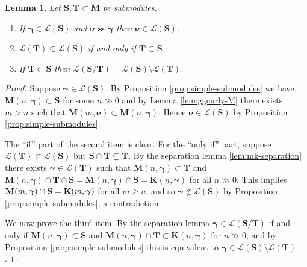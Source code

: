 \documentclass[11pt,fleqn]{amsart}
\newtheorem{lem}[thm]{Lemma}
\theoremstyle{definition}
\theoremstyle{remark}
\theoremstyle{remark}
\newcommand\wt[1]{\boldsymbol{#1}}
\begin{document}
\begin{lem}
\label{lem:support-sets}
Let $\mathbf S, \mathbf T \subset \mathbf M$ be submodules. 
\begin{enumerate}
  \item If $\wt\gamma \in \mathcal L(\mathbf S)$ and $\wt\nu \ggcurly \wt\gamma$
    then $\wt\nu \in \mathcal L(\mathbf S)$.

  \item $\mathcal L(\mathbf T) \subset \mathcal L(\mathbf S)$ if and only if 
    $\mathbf T \subset \mathbf S$.

  \item If $\mathbf T \subset \mathbf S$ then $\mathcal L(\mathbf 
    S / \mathbf T) = \mathcal L(\mathbf S) \setminus \mathcal L(\mathbf T)$.
\end{enumerate}
\end{lem}
\begin{proof}
Suppose $\wt\gamma \in \mathcal L(\mathbf S)$. By Proposition 
\ref{prop:simple-submodules} we have $\mathbf M(n,\wt\gamma) \subset \mathbf S$ 
for some $n \gg 0$ and by Lemma \ref{lem:ggcurly-M} there exists $m > n$ such
that $\mathbf M(m,\wt\nu) \subset \mathbf M(n,\wt\gamma)$. Hence $\wt\nu \in 
\mathcal L(\mathbf S)$ by Proposition \ref{prop:simple-submodules}.

The ``if'' part of the second item is clear. For the ``only if'' part, suppose 
$\mathcal 
L(\mathbf T) \subset \mathcal L(\mathbf S)$ but $\mathbf S \cap \mathbf T 
\subsetneq \mathbf T$. By the separation lemma \ref{lem:mk-separation} there 
exists $\wt\gamma \in \mathcal L(\mathbf T)$ such that $\mathbf M(n,
\wt\gamma) \subset \mathbf T$ and $\mathbf M(n,\wt\gamma) \cap \mathbf T \cap 
\mathbf S = \mathbf M(n,\wt\gamma) \cap \mathbf S = \mathbf K(n,\wt\gamma)$ for 
all $n \gg 0$. This implies $\textbf M(m,\wt\gamma) \cap \mathbf S = \mathbf 
K(m,\wt\gamma)$ for all $m \geq n$, and so $\wt\gamma \notin \mathcal L(\mathbf 
S)$ by Proposition \ref{prop:simple-submodules}, a contradiction.

We now prove the third item. By the separation lemma $\wt\gamma \in \mathcal 
L(\mathbf S/\mathbf T)$ if and only if $\mathbf M(n,\wt\gamma) \subset \mathbf 
S$ and $\mathbf M(n,\wt\gamma) \cap \mathbf T \subset \mathbf K(n,\wt\gamma)$ 
for $n \gg 0$, and by Proposition \ref{prop:simple-submodules} this is 
equivalent to $\wt \gamma \in \mathcal L(\mathbf S) \setminus \mathcal 
L(\mathbf T)$. 
\end{proof}
\end{document}
